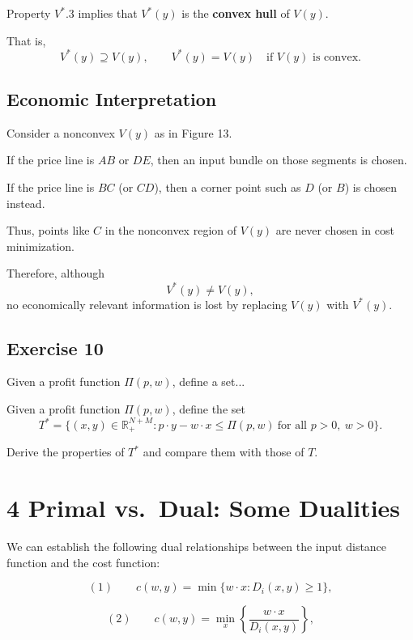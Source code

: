 Property $V^*.3$ implies that $V^*(y)$ is the \textbf{convex hull} of $V(y)$.

That is,
\[
V^*(y) \supseteq V(y),
\qquad
V^*(y)=V(y) \quad \text{if $V(y)$ is convex}.
\]

\medskip

\subsection*{Economic Interpretation}

Consider a nonconvex $V(y)$ as in Figure 13.

If the price line is $AB$ or $DE$, then an input bundle on those segments is chosen.

If the price line is $BC$ (or $CD$), then a corner point such as $D$ (or $B$)
is chosen instead.

Thus, points like $C$ in the nonconvex region of $V(y)$ are never chosen
in cost minimization.

\medskip

Therefore, although
\[
V^*(y) \ne V(y),
\]
no economically relevant information is lost by replacing $V(y)$ with $V^*(y)$.

\begin{tcolorbox}

\subsection*{Exercise 10}

Given a profit function $\Pi(p,w)$, define a set...


Given a profit function $\Pi(p,w)$, define the set
\[
T^*
=
\{(x,y)\in \mathbb{R}_+^{N+M} : p\cdot y - w\cdot x \le \Pi(p,w)
\ \text{for all } p>0,\ w>0\}.
\]

Derive the properties of $T^*$ and compare them with those of $T$.

\end{tcolorbox}

\section{4 Primal vs.\ Dual: Some Dualities}

We can establish the following dual relationships between the input
distance function and the cost function:

\[
(1)\qquad
c(w,y)
=
\min \{w\cdot x : D_i(x,y)\ge 1\},
\]

\[
(2)\qquad
c(w,y)
=
\min_x \left\{ \frac{w\cdot x}{D_i(x,y)} \right\},
\]


